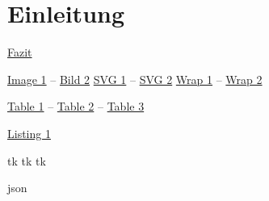 \chapter{Einleitung}\label{ch:intro}
\hyperref[ch:conclusion]{Fazit}

\autocite{CleanCode} \newline
\autocite[S.12]{CleanCode} \newline
\newline \autocite[vgl.][S.12]{CleanCode} \newline

\hyperref[fig:example-image-1]{Image 1} -- \hyperref[fig:example-image-2]{Bild 2}
\hyperref[fig:example-svg-1]{SVG 1} -- \hyperref[fig:example-svg-2]{SVG 2}
\hyperref[fig:example-wrap-1]{Wrap 1} -- \hyperref[fig:example-wrap-2]{Wrap 2}

\hyperref[tab:example-table-1]{Table 1} -- \hyperref[tab:example-table-2]{Table 2} -- \hyperref[tab:example-table-3]{Table 3}

\hyperref[lst:example-lst-1]{Listing 1}

\acrfull{tk} \newline
\acrlong{tk} \newline
\acrshort{tk} \newline

\acrfull{json}